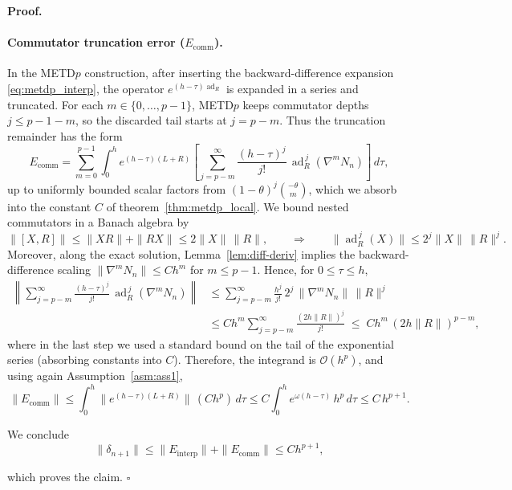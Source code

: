 \documentclass[12pt]{article}
\DeclareMathOperator{\ad}{ad}
\newenvironment{pf}{\noindent\textbf{Proof.}}{\hfill$\square$}
\begin{document}
\begin{pf}
\paragraph{Commutator truncation error ($E_{\mathrm{comm}}$).}
In the METD$p$ construction, after inserting the backward-difference expansion
\eqref{eq:metdp_interp}, the operator $e^{(h-\tau)\ad_R}$ is expanded in a series and truncated.
For each $m\in\{0,\dots,p-1\}$, METD$p$ keeps commutator depths $j\le p-1-m$, so the discarded tail starts at $j=p-m$.
Thus the truncation remainder has the form
\begin{equation}
E_{\mathrm{comm}}
= \sum_{m=0}^{p-1}\int_0^h e^{(h-\tau)(L+R)}
\left[\sum_{j=p-m}^{\infty}\frac{(h-\tau)^j}{j!}\,\ad_R^{\,j}(\nabla^m N_n)\right]\,d\tau,
\end{equation}
up to uniformly bounded scalar factors from $(1-\theta)^j\binom{-\theta}{m}$, which we absorb into the constant $C$ of theorem~\ref{thm:metdp_local}.
We bound nested commutators in a Banach algebra by
\begin{equation*}
\|[X,R]\|\le \|XR\|+\|RX\|\le 2\|X\|\,\|R\|,
\qquad\Rightarrow\qquad
\|\ad_R^{\,j}(X)\|\le 2^j\|X\|\,\|R\|^j.
\end{equation*}
Moreover, along the exact solution, Lemma~\ref{lem:diff-deriv} implies the backward-difference scaling
$\|\nabla^m N_n\|\le C h^m$ for $m\le p-1$.
Hence, for $0\le \tau\le h$,
\begin{align*}
\left\|\sum_{j=p-m}^{\infty}\frac{(h-\tau)^j}{j!}\,\ad_R^{\,j}(\nabla^m N_n)\right\|
&\le \sum_{j=p-m}^{\infty}\frac{h^j}{j!}\,2^j\,\|\nabla^m N_n\|\,\|R\|^j \\
&\le C h^m\sum_{j=p-m}^{\infty}\frac{(2h\|R\|)^j}{j!}
\;\le\; C h^m\,(2h\|R\|)^{p-m},
\end{align*}
where in the last step we used a standard bound on the tail of the exponential series (absorbing constants into $C$).
Therefore, the integrand is $\mathcal{O}(h^p)$, and using again Assumption~\ref{asm:ass1},
\begin{equation*}
\|E_{\mathrm{comm}}\|
\le \int_0^h \|e^{(h-\tau)(L+R)}\|\, (C h^p)\,d\tau
\le C\int_0^h e^{\omega(h-\tau)}\,h^p\,d\tau
\le C\,h^{p+1}.
\end{equation*}

We conclude
\begin{equation*}
    \|\delta_{n+1}\|
\le \|E_{\mathrm{interp}}\|+\|E_{\mathrm{comm}}\|
\le C h^{p+1},
\end{equation*}

which proves the claim.
\end{pf}
\end{document}
